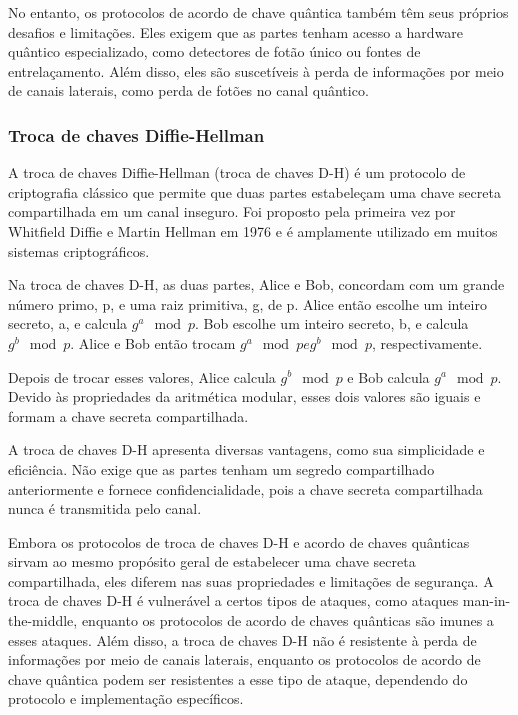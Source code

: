 No entanto, os protocolos de acordo de chave quântica também têm seus próprios desafios e limitações. Eles exigem que as partes tenham acesso a hardware quântico especializado, como detectores de fotão único ou fontes de entrelaçamento. Além disso, eles são suscetíveis à perda de informações por meio de canais laterais, como perda de fotões no canal quântico.

\subsubsection{Troca de chaves Diffie-Hellman}

A troca de chaves Diffie-Hellman (troca de chaves D-H) é um protocolo de criptografia clássico que permite que duas partes estabeleçam uma chave secreta compartilhada em um canal inseguro. Foi proposto pela primeira vez por Whitfield Diffie e Martin Hellman em 1976 e é amplamente utilizado em muitos sistemas criptográficos.

Na troca de chaves D-H, as duas partes, Alice e Bob, concordam com um grande número primo, p, e uma raiz primitiva, g, de p. Alice então escolhe um inteiro secreto, a, e calcula \(g^a \mod p\). Bob escolhe um inteiro secreto, b, e calcula \(g^b \mod p\). Alice e Bob então trocam \(g^a \mod p e g^b \mod p\), respectivamente.

Depois de trocar esses valores, Alice calcula \(g^b \mod p\) e Bob calcula \(g^a \mod p\). Devido às propriedades da aritmética modular, esses dois valores são iguais e formam a chave secreta compartilhada.

A troca de chaves D-H apresenta diversas vantagens, como sua simplicidade e eficiência. Não exige que as partes tenham um segredo compartilhado anteriormente e fornece confidencialidade, pois a chave secreta compartilhada nunca é transmitida pelo canal.

Embora os protocolos de troca de chaves D-H e acordo de chaves quânticas sirvam ao mesmo propósito geral de estabelecer uma chave secreta compartilhada, eles diferem nas suas propriedades e limitações de segurança. A troca de chaves D-H é vulnerável a certos tipos de ataques, como ataques man-in-the-middle, enquanto os protocolos de acordo de chaves quânticas são imunes a esses ataques. Além disso, a troca de chaves D-H não é resistente à perda de informações por meio de canais laterais, enquanto os protocolos de acordo de chave quântica podem ser resistentes a esse tipo de ataque, dependendo do protocolo e implementação específicos.

